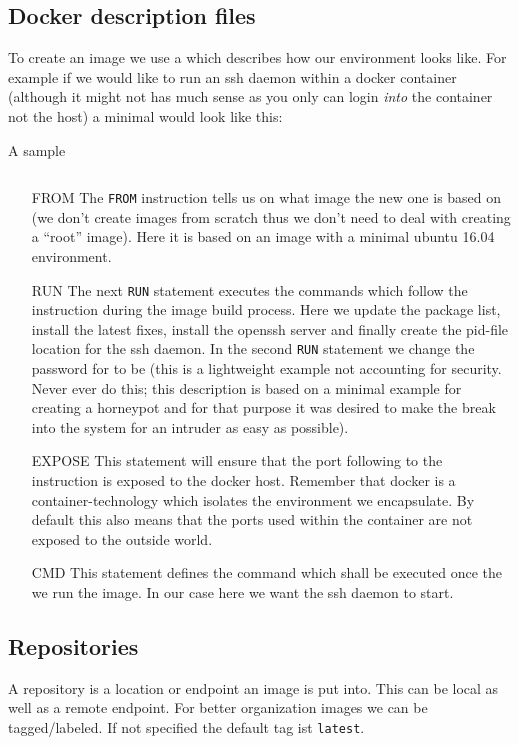 		\subsection{Docker description files}
		To create an image we use a \emph{\dockerfile{}} which describes how our environment looks like. For example if we would like to run an ssh daemon within a docker container (although it might not has much sense as you only can login \emph{into} the container not the host) a minimal \dockerfile{} would look like this:
		\begin{listing}[H]
			\caption{A sample \dockerfile{}}
			\label{lst:p01:ch05:sample_dockerfile}
			\inputminted{text}{\relative{chapter_04/section_5.1.2/Dockerfile}}
		\end{listing}
		\begin{itemize}
			\item[FROM] The \texttt{FROM} instruction tells us on what image the new one is based on (we don't create images from scratch thus we don't need to deal with creating a ``root'' image). Here it is based on an image with a minimal ubuntu 16.04 environment. 
			\item[RUN] The next \texttt{RUN} statement executes the commands which follow the instruction during the image build process. Here we update the package list, install the latest fixes, install the openssh server and finally create the pid-file location for the ssh daemon. In the second \texttt{RUN} statement we change the password for \rootuser{} to be \rootuser{} (this is a lightweight example not accounting for security. Never ever do this; this description is based on a minimal example for creating a horneypot and for that purpose it was desired to make the break into the system for an intruder as easy as possible).
			\item[EXPOSE] This statement will ensure that the port following to the instruction is exposed to the docker host. Remember that docker is a container-technology which isolates the environment we encapsulate. By default this also means that the ports used within the container are not exposed to the outside world.
			\item[CMD] This statement defines the command which shall be executed once the we run the image. In our case here we want the ssh daemon to start.
		\end{itemize}

		\subsection{Repositories}
		A repository is a location or endpoint an image is put into. This can be local as well as a remote endpoint. For better organization images we can be tagged/labeled. If not specified the default tag ist \texttt{latest}.
